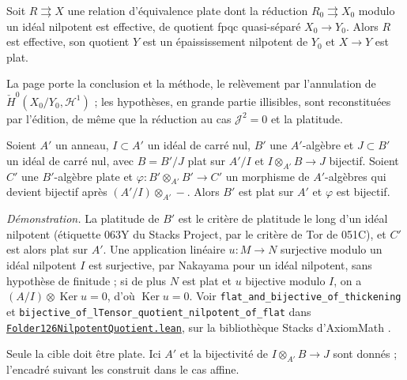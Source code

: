 \begin{encadre}
\begin{theoreme*}\nonverifie
Soit $R \rightrightarrows X$ une relation d'équivalence plate dont la réduction $R_0 \rightrightarrows X_0$ modulo un idéal nilpotent est effective, de quotient fpqc quasi-séparé $X_0 \to Y_0$. Alors $R$ est effective, son quotient $Y$ est un épaississement nilpotent de $Y_0$ et $X \to Y$ est plat.
\end{theoreme*}
\end{encadre}
{\small La page porte la conclusion et la méthode, le relèvement par l'annulation de $\check H^0(X_0/Y_0, \mathcal H^1)$ ; les hypothèses, en grande partie illisibles, sont reconstituées par l'édition, de même que la réduction au cas $\mathcal J^2 = 0$ et la platitude.\par}

\begin{encadre}
\begin{theoreme*}
Soient $A'$ un anneau, $I \subset A'$ un idéal de carré nul, $B'$ une $A'$-algèbre et $J \subset B'$ un idéal de carré nul, avec $B = B'/J$ plat sur $A'/I$ et $I \otimes_{A'} B \to J$ bijectif. Soient $C'$ une $B'$-algèbre plate et $\varphi : B' \otimes_{A'} B' \to C'$ un morphisme de $A'$-algèbres qui devient bijectif après $(A'/I) \otimes_{A'} -$. Alors $B'$ est plat sur $A'$ et $\varphi$ est bijectif.
\end{theoreme*}
\end{encadre}
{\small \emph{Démonstration.} La platitude de $B'$ est le critère de platitude le long d'un idéal nilpotent (étiquette 063Y du Stacks Project, par le critère de Tor de 051C), et $C'$ est alors plat sur $A'$. Une application linéaire $u : M \to N$ surjective modulo un idéal nilpotent $I$ est surjective, par Nakayama pour un idéal nilpotent, sans hypothèse de finitude ; si de plus $N$ est plat et $u$ bijective modulo $I$, on a $(A/I) \otimes \operatorname{Ker} u = 0$, d'où $\operatorname{Ker} u = 0$. Voir \texttt{flat\_and\_bijective\_of\_thickening} et \texttt{bijective\_of\_lTensor\_quotient\_nilpotent\_of\_flat} dans \href{\leanblobmain/AlgebraicGeometry/Folder126NilpotentQuotient.lean}{\texttt{Folder126NilpotentQuotient.\allowbreak{}lean}}, sur la bibliothèque Stacks d'AxiomMath \cite{axiomstacks}.

Seule la cible doit être plate. Ici $A'$ et la bijectivité de $I \otimes_{A'} B \to J$ sont donnés ; l'encadré suivant les construit dans le cas affine.\par}

